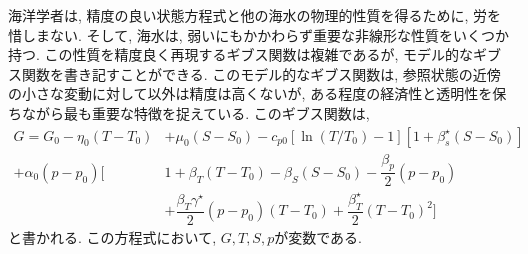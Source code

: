 海洋学者は, 精度の良い状態方程式と他の海水の物理的性質を得るために, 労を惜しまない. 
そして, 海水は, 弱いにもかかわらず重要な非線形な性質をいくつか持つ. 
この性質を精度良く再現するギブス関数は複雑であるが, 
モデル的なギブス関数を書き記すことができる. 
このモデル的なギブス関数は, 参照状態の近傍の小さな変動に対して以外は精度は高くないが, 
ある程度の経済性と透明性を保ちながら最も重要な特徴を捉えている. 
このギブス関数は, 
\begin{equation}
\begin{split}
  G =   G_0 - \eta_0 (T-T_0)& + \mu_0(S-S_0) 
      - c_{p0} \left[\ln{(T/T_0)} - 1 \right]\left[1 + \beta_s^\star(S-S_0) \right] \\
      + \alpha_0(p-p_0) \bigg[& 1 + \beta_T(T-T_0) - \beta_S (S-S_0) - \dfrac{\beta_p}{2} (p-p_0) \\
                              &+ \dfrac{\beta_T \gamma^\star}{2} (p-p_0)(T-T_0) 
                              + \dfrac{\beta_T^\star}{2} (T-T_0)^2
                              \bigg]
\end{split}
\label{eq:modelGibssFunction}
\end{equation}
と書かれる. 
この方程式において, $G,T,S,p$が変数である. 

